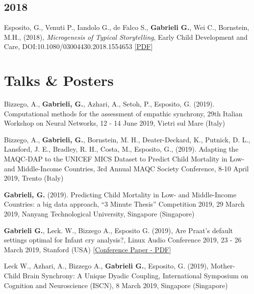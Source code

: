 \documentclass[a4paper]{deedy-resume} %
\begin{document}
\begin{minipage}[t]{0.63\textwidth}
\begin{tightitemize}
	    \sectionspace
	    \subsection{2018}
	        \item  Esposito, G., Venuti P., Iandolo G., de Falco S., \textbf{Gabrieli G.}, Wei C., Bornstein, M.H.,  (2018), \textit{Microgenesis of Typical Storytelling}, Early Child Development and Care, DOI:10.1080/03004430.2018.1554653 
	        [\href{https://www.tandfonline.com/doi/full/10.1080/03004430.2018.1554653}{PDF}]
	    
		\end{tightitemize}
		\sectionspace
	
	\section{Talks \& Posters}
	
	\sectionspace %
	\begin{tightitemize}
	    \item Bizzego, A., \textbf{Gabrieli, G.}, Azhari, A., Setoh, P., Esposito, G. (2019). Computational methods for the assessment of empathic synchrony, 29th Italian Workshop on Neural Networks, 12 - 14 June 2019, Vietri sul Mare (Italy)
	    \item Bizzego, A., \textbf{Gabrieli, G.}, Bornstein, M. H., Deater-Deckard, K., Putnick, D. L., Lansford, J. E., Bradley, R. H., Costa, M., Esposito, G., (2019). Adapting the MAQC-DAP to the UNICEF MICS Dataset to Predict Child Mortality in Low- and Middle-Income Countries, 3rd Annual MAQC Society Conference, 8-10 April 2019, Trento (Italy)
	    \item \textbf{Gabrieli, G.} (2019). Predicting Child Mortality in Low- and Middle-Income Countries: a big data approach, “3 Minute Thesis” Competition 2019, 29 March 2019, Nanyang Technological University, Singapore (Singapore)
	    \item \textbf{Gabrieli G.}, Leck. W., Bizzego A., Esposito G. (2019), Are Praat's default settings optimal for Infant cry analysis?, Linux Audio Conference 2019, 23 - 26 March 2019, Stanford (USA) [\href{http://lac.linuxaudio.org/2019/doc/gabrieli.pdf}{Conference Paper - PDF}]
	    \item Leck W., Azhari, A., Bizzego A., \textbf{Gabrieli G.}, Esposito, G. (2019), Mother-Child Brain Synchrony: A Unique Dyadic Coupling, International Symposium on Cognition and Neuroscience (ISCN), 8 March 2019, Singapore (Singapore)

				
	\end{tightitemize}
		
\end{minipage} %
	
\end{document}
